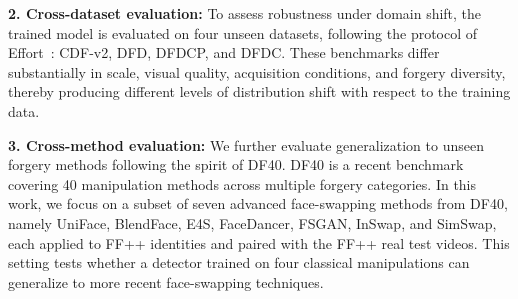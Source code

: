 \documentclass[fonts]{icst}
\newif\ifrevmark\revmarkfalse
\newcommand{\rev}[1]{\ifrevmark{\color{revblue}#1}\else#1\fi}
\begin{document}
\begin{table}[!t]
\centering
\captionsetup{labelsep=period, labelfont=bf, hypcap=false}
\caption{Benchmarking results of cross-dataset evaluations (Protocol-\rev{2}) and cross-method evaluations (Protocol-\rev{3}).
All detectors are trained on FF++ c23~\cite{rossler2019ff} and evaluated on other fake data.
\rev{The results of other methods are taken from Table~1 of Effort~\cite{yan2025effort} and, for ForAda and GenD, from their papers; $\dagger$ marks the authors' released checkpoints. These numbers come from different training recipes and checkpoint-selection rules (Sec.~\ref{sec:selection}) and are not directly comparable with our row, which is selected on FF++ validation only and averaged over $n$ seeds.} Bold: best; shaded: second best.}
\label{tab:comparison}
\label{tab:literature}
\vspace{2mm}
\resizebox{\textwidth}{!}{}
\vspace{3mm}

\centering
\captionsetup{labelsep=period, labelfont=bf, hypcap=false}
\caption{\rev{Video AUC of re-trained methods under the same protocol (FF++ c23 training, checkpoint selected on the FF++ validation split). Avg(D) and Avg(M) are mean $\pm$ standard deviation over $n$ seeds; per-dataset values are seed means. Params: trainable parameters of the deployed model. Bold: best; shaded: second best.}}
\label{tab:main}
\vspace{2mm}
\resizebox{\textwidth}{!}{}
\end{table}

\textbf{2. Cross-dataset evaluation:}
To assess robustness under domain shift, the trained model is evaluated on \rev{four} unseen datasets\rev{, following the protocol of Effort~\cite{yan2025effort}}: CDF-v2, DFD, DFDCP, and DFDC.
These benchmarks differ substantially in scale, visual quality, acquisition conditions, and forgery diversity, thereby producing different levels of distribution shift with respect to the training data.

\textbf{3. Cross-method evaluation:}
We further evaluate generalization to unseen forgery methods following the spirit of DF40.
DF40 is a recent benchmark covering 40 manipulation methods across multiple forgery categories.
In this work, we focus on a subset of seven advanced face-swapping methods from DF40, namely UniFace, BlendFace, E4S, FaceDancer, FSGAN, InSwap, and SimSwap\rev{, each applied to FF++ identities and paired with the FF++ real test videos}.
This setting tests whether a detector trained on four classical manipulations can generalize to more recent face-swapping techniques.
\end{document}
